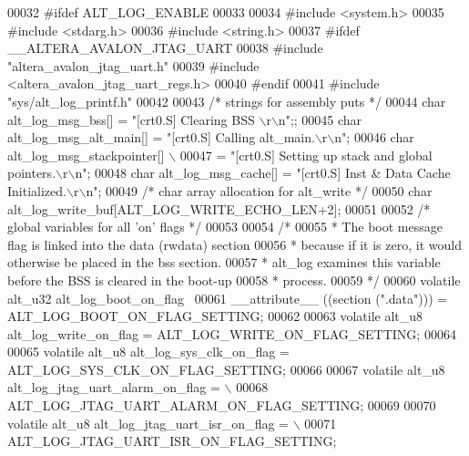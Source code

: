 \begin{DoxyCode}
00032 \textcolor{preprocessor}{#ifdef ALT\_LOG\_ENABLE}
00033 
00034 \textcolor{preprocessor}{#include <system.h>}
00035 \textcolor{preprocessor}{#include <stdarg.h>}
00036 \textcolor{preprocessor}{#include <string.h>}
00037 \textcolor{preprocessor}{#ifdef \_\_ALTERA\_AVALON\_JTAG\_UART}
00038 \textcolor{preprocessor}{   #include "altera\_avalon\_jtag\_uart.h"}
00039 \textcolor{preprocessor}{   #include <altera\_avalon\_jtag\_uart\_regs.h>}
00040 \textcolor{preprocessor}{#endif}
00041 \textcolor{preprocessor}{#include "sys/alt_log_printf.h"}
00042 
00043 \textcolor{comment}{/* strings for assembly puts */}
00044 \textcolor{keywordtype}{char} alt\_log\_msg\_bss[] = \textcolor{stringliteral}{"[crt0.S] Clearing BSS \(\backslash\)r\(\backslash\)n"};;
00045 \textcolor{keywordtype}{char} alt\_log\_msg\_alt\_main[] = \textcolor{stringliteral}{"[crt0.S] Calling alt\_main.\(\backslash\)r\(\backslash\)n"};
00046 \textcolor{keywordtype}{char} alt\_log\_msg\_stackpointer[] \(\backslash\)
00047     = \textcolor{stringliteral}{"[crt0.S] Setting up stack and global pointers.\(\backslash\)r\(\backslash\)n"};
00048 \textcolor{keywordtype}{char} alt\_log\_msg\_cache[] = \textcolor{stringliteral}{"[crt0.S] Inst & Data Cache Initialized.\(\backslash\)r\(\backslash\)n"};
00049 \textcolor{comment}{/* char array allocation for alt\_write */}
00050 \textcolor{keywordtype}{char} alt\_log\_write\_buf[ALT\_LOG\_WRITE\_ECHO\_LEN+2];
00051 
00052 \textcolor{comment}{/* global variables for all 'on' flags */}
00053 
00054 \textcolor{comment}{/* }
00055 \textcolor{comment}{ * The boot message flag is linked into the data (rwdata) section}
00056 \textcolor{comment}{ * because if it is zero, it would otherwise be placed in the bss section.}
00057 \textcolor{comment}{ * alt\_log examines this variable before the BSS is cleared in the boot-up}
00058 \textcolor{comment}{ * process.}
00059 \textcolor{comment}{ */}
00060 \textcolor{keyword}{volatile} alt_u32 alt_log_boot_on_flag \
00061   __attribute__ ((section (\textcolor{stringliteral}{".data"}))) = ALT\_LOG\_BOOT\_ON\_FLAG\_SETTING;
00062 
00063 \textcolor{keyword}{volatile} alt_u8 alt\_log\_write\_on\_flag = ALT\_LOG\_WRITE\_ON\_FLAG\_SETTING;
00064 
00065 \textcolor{keyword}{volatile} alt_u8 alt\_log\_sys\_clk\_on\_flag = ALT\_LOG\_SYS\_CLK\_ON\_FLAG\_SETTING;
00066 
00067 \textcolor{keyword}{volatile} alt_u8 alt\_log\_jtag\_uart\_alarm\_on\_flag = \(\backslash\)
00068   ALT\_LOG\_JTAG\_UART\_ALARM\_ON\_FLAG\_SETTING;
00069 
00070 \textcolor{keyword}{volatile} alt_u8 alt\_log\_jtag\_uart\_isr\_on\_flag = \(\backslash\)
00071   ALT\_LOG\_JTAG\_UART\_ISR\_ON\_FLAG\_SETTING;

\end{DoxyCode}
